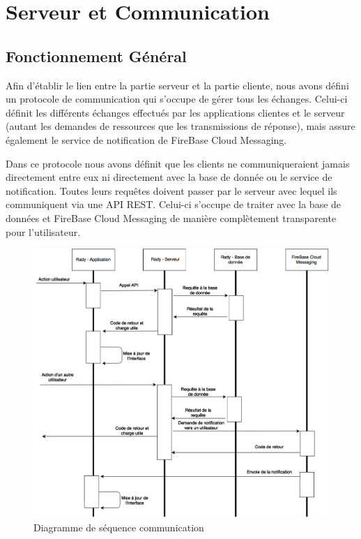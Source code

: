 \documentclass[french]{article}
\begin{document}
	\section{Serveur et Communication}	
	\subsection{Fonctionnement Général}
	
	Afin d'établir le lien entre la partie serveur et la partie cliente, nous avons défini un protocole de communication qui s'occupe de gérer tous les échanges. Celui-ci définit les différents échanges effectués par les applications clientes et le serveur (autant les demandes de ressources que les transmissions de réponse), mais assure également le service de notification de FireBase Cloud Messaging. 
	
	\medbreak
	
	Dans ce protocole nous avons définit que les clients ne communiqueraient jamais directement entre eux ni directement avec la base de donnée ou le service de notification. Toutes leurs requêtes doivent passer par le serveur avec lequel ils communiquent via une API REST. Celui-ci s'occupe de traiter avec la base de données et FireBase Cloud Messaging de manière complètement transparente pour l'utilisateur.
	
	\begin{figure}[H]
		\centering
		\includegraphics[scale=0.5]{../schema/schema-sequence-communication.png}
		\caption{Diagramme de séquence communication}
		\label{Diagramme de séquence communication}
	\end{figure}
	
\end{document}
